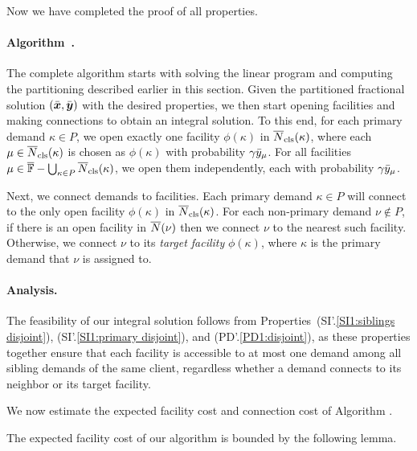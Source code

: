 Now we have completed the proof of all properties.

\paragraph{Algorithm~{\EBGS}.}
The complete algorithm starts with solving the linear program and
computing the partitioning described earlier in this section.
Given the partitioned fractional solution $(\bar{\boldsymbol{x}},
\bar{\boldsymbol{y}})$ with the desired properties, we then start opening
facilities and making connections to obtain an integral
solution. To this end, for each primary demand $\kappa\in P$,
we open exactly one facility $\phi(\kappa)$ in ${\overline{N}}_{\text{cls}}(\kappa)$,
where each $\mu\in{\overline{N}}_{\text{cls}}(\kappa)$ is chosen as $\phi(\kappa)$ with probability
$\gamma{\bar y}_{\mu}$. For all facilities
 $\mu\in\overline{\mathbb{F}} - \bigcup_{\kappa\in P}{\overline{N}}_{\text{cls}}(\kappa)$,
we open them independently, each with
probability $\gamma{\bar y}_{\mu}$. 

Next, we connect demands to facilities.
Each primary demand $\kappa\in P$ will connect
to the only open facility $\phi(\kappa)$ in ${\overline{N}}_{\text{cls}}(\kappa)$.  
For each non-primary demand $\nu\notin P$, if
there is an open facility in ${\overline{N}}(\nu)$ then we connect
$\nu$ to the nearest such facility. Otherwise, we connect
$\nu$ to its \emph{target facility} $\phi(\kappa)$, where $\kappa$ is the primary
demand that $\nu$ is assigned to. 


\paragraph{Analysis.}
The feasibility of our integral solution follows from
Properties~(SI'.\ref{SI1:siblings disjoint}), (SI'.\ref{SI1:primary
  disjoint}), and (PD'.\ref{PD1:disjoint}), as these properties together
ensure that each facility is accessible to at most one demand among
all sibling demands of the same client, regardless whether a demand
connects to its neighbor or its target facility.

We now estimate the expected facility cost and connection cost of
Algorithm {\EBGS}.

The expected facility cost of our algorithm is bounded by the
following lemma.

